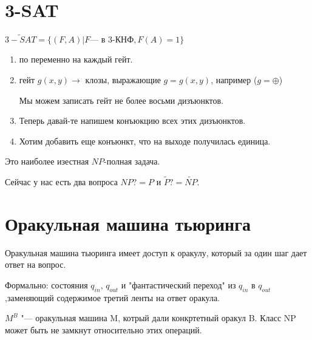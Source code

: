 \section{3-SAT}
$\tilde{3-SAT} = \{(F, A)|F \text{--- в 3-КНФ}, F(A) = 1\}$
 
\begin{enumerate}
 \item по переменно на каждый гейт. 
 \item гейт $g(x, y) \to$ клозы, выражающие $g = g(x, y)$, 
 например ($g = \oplus$)
 
 Мы можем записать гейт не более восьми дизъюнктов. 
 \item 
 Теперь давай-те напишем конъюкцию всех этих дизъюнктов. 
 \item 
 Хотим добавить еще конъюнкт, что на выходе получилась единица. 
\end{enumerate}

Это наиболее изестная $NP$-полная задача. 

Сейчас у нас есть два вопроса $NP ?= P$ и $\tilde P ?= \tilde{NP}$.
\section{Оракульная машина тьюринга}
Оракульная машина тьюринга имеет доступ к оракулу, который за один шаг
дает ответ на вопрос. 

Формально: состояния $q_{in}$, $q_{out}$  и "фантастический переход" из 
$q_{in}$ в $q_{out}$,заменяющий содержимое третий ленты на ответ оракула. 

$M^B$ "--- оракульная машина M, котрый дали конкртетный оракул B. Класс NP может 
быть не замкнут относительно этих операций. 